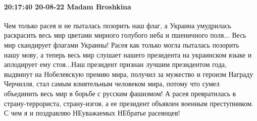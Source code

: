  
 
 
 
 

\paragraph{20:17:40 20-08-22 Madam Broshkina}

Чем только расея и не пыталась позорить наш флаг, а Украина умудрилась
раскрасить весь мир цветами мирного голубого неба и пшеничного поля... Весь мир
скандирует флагами Украины! Расея как только могла пыталась позорить нашу мову,
а теперь весь мир слушает нашего президента на украинском языке и аплодирует
ему стоя...Наш президент признан лучшим президентом года, выдвинут на
Нобелевскую премию мира, получил за мужество и героизм Награду Черчилля, стал
самым влиятельным человеком мира, потому что сумел объединить весь мир в борьбе
с русским фашизмом! А расея превратилась в страну-террориста, страну-изгоя, а
ее президент объявлен военным преступником. С чем я и поздравляю НЕуважаемых
НЕбратье расеянцев!
